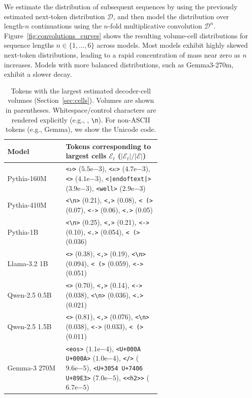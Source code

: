 We estimate the distribution of subsequent sequences by using the previously estimated next-token distribution $\mathcal{D}$, and then model the distribution over length-$n$ continuations using the $n$-fold multiplicative convolution $\mathcal{D}^n$. 
Figure~\ref{fig:convolutions_curves} shows the resulting volume-cell distributions for sequence lengths $n \in \{1,\dots,6\}$ across models. 
Most models exhibit highly skewed next-token distributions, leading to a rapid concentration of mass near zero as $n$ increases. 
Models with more balanced distributions, such as Gemma3-270m, exhibit a slower decay.

\begin{table}[t]
\centering
\small
\caption{Tokens with the largest estimated decoder-cell volumes (Section~\ref{sec:cells}). Volumes are shown in parentheses. Whitespace/control characters are rendered explicitly (e.g., \texttt{\textvisiblespace}, \texttt{\textbackslash n}). For non-ASCII tokens (e.g., Gemma), we show the Unicode code.}
\label{tbl:top_tokens}
\begin{tabular}{l p{0.62\linewidth}}
\toprule
Model & Tokens corresponding to largest cells $\mathcal{E}_t$ ($|\mathcal{E}_t|/|\mathcal{E}|$) \\
\midrule
Pythia-160M &
\texttt{<}$\nu$\texttt{>} ($5.5\mathrm{e}{-3}$), \texttt{<}$\kappa$\texttt{>} ($4.7\mathrm{e}{-3}$), \texttt{<\textvisiblespace>} ($4.1\mathrm{e}{-3}$), \texttt{<|endoftext|>} ($3.9\mathrm{e}{-3}$), \texttt{<well>} ($2.9\mathrm{e}{-3}$)\\
Pythia-410M &
\texttt{<\textbackslash n>} (0.21), \texttt{<,>} (0.08), \texttt{< (>} (0.07), \texttt{<->} (0.06), \texttt{<.>} (0.05)\\
Pythia-1B &
\texttt{<\textbackslash n>} (0.25), \texttt{<,>} (0.21), \texttt{<->} (0.10), \texttt{<.>} (0.054), \texttt{< (>} (0.036)\\
Llama-3.2 1B &
\texttt{<\textvisiblespace>} (0.38), \texttt{<,>} (0.19), \texttt{<\textbackslash n>} (0.094), \texttt{< (>} (0.059), \texttt{<->} (0.051)\\
Qwen-2.5 0.5B &
\texttt{<\textvisiblespace>} (0.70), \texttt{<,>} (0.14), \texttt{<->} (0.038), \texttt{<\textbackslash n>} (0.036), \texttt{<.>} (0.021)\\
Qwen-2.5 1.5B &
\texttt{<\textvisiblespace>} (0.81), \texttt{<,>} (0.076), \texttt{<\textbackslash n>} (0.038), \texttt{<->} (0.033), \texttt{< (>} (0.011)\\
Gemma-3 270M &
\texttt{<eos>} ($1.1\mathrm{e}{-4}$), \texttt{<U+000A U+000A>} ($1.0\mathrm{e}{-4}$), \texttt{</>} ($9.6\mathrm{e}{-5}$), \texttt{<U+3054 U+7406 U+89E3>} ($7.0\mathrm{e}{-5}$), \texttt{<<h2>>} ($6.7\mathrm{e}{-5}$)\\
\bottomrule
\end{tabular}
\end{table}

